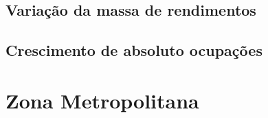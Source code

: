 \documentclass[8pt]{beamer}
\begin{document}
\subsection{Variação da massa de rendimentos}

\begin{frame}
\textit{\hyperlink{indice_principal_amz_urbana}{}}

\end{frame}

\begin{frame}
\textit{\hyperlink{indice_principal_amz_urbana}{}}

\end{frame}

\subsection{Crescimento de absoluto ocupações}

\begin{frame}
\textit{\hyperlink{indice_principal_amz_urbana}{}}

\end{frame}

\begin{frame}
\textit{\hyperlink{indice_principal_amz_urbana}{}}

\end{frame}

\section{Zona Metropolitana}
\end{document}
